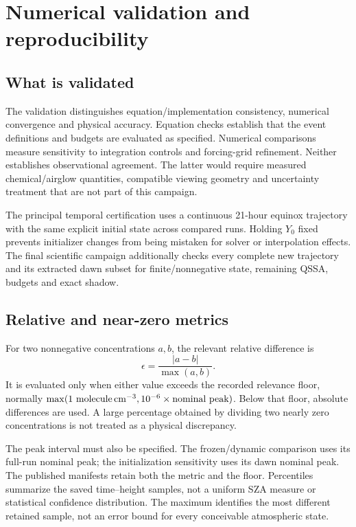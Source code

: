 \chapter{Numerical validation and reproducibility}\label{ch:validation}
\section{What is validated}
The validation distinguishes equation/implementation consistency, numerical convergence and physical accuracy. Equation checks establish that the event definitions and budgets are evaluated as specified. Numerical comparisons measure sensitivity to integration controls and forcing-grid refinement. Neither establishes observational agreement. The latter would require measured chemical/airglow quantities, compatible viewing geometry and uncertainty treatment that are not part of this campaign.

The principal temporal certification uses a continuous 21-hour equinox trajectory with the same explicit initial state across compared runs. Holding $Y_0$ fixed prevents initializer changes from being mistaken for solver or interpolation effects. The final scientific campaign additionally checks every complete new trajectory and its extracted dawn subset for finite/nonnegative state, remaining QSSA, budgets and exact shadow.

\section{Relative and near-zero metrics}
For two nonnegative concentrations $a,b$, the relevant relative difference is
\begin{equation}\epsilon=\frac{|a-b|}{\max(a,b)}.\label{eq:metric}\end{equation}
It is evaluated only when either value exceeds the recorded relevance floor, normally $\max(1~\mathrm{molecule\,cm^{-3}},10^{-6}\times\text{nominal peak})$. Below that floor, absolute differences are used. A large percentage obtained by dividing two nearly zero concentrations is not treated as a physical discrepancy.

The peak interval must also be specified. The frozen/dynamic comparison uses its full-run nominal peak; the initialization sensitivity uses its dawn nominal peak. The published manifests retain both the metric and the floor. Percentiles summarize the saved time--height samples, not a uniform SZA measure or statistical confidence distribution. The maximum identifies the most different retained sample, not an error bound for every conceivable atmospheric state.

